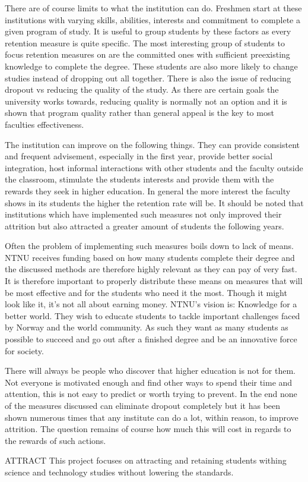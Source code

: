 \bigskip\noindent
There are of course limits to what the institution can do.
Freshmen start at these institutions with varying skills, abilities, interests and commitment to complete a given program of study.
It is useful to group students by these factors as every retention measure is quite specific.
The most interesting group of students to focus retention measures on are the committed ones with sufficient preexisting knowledge to complete the degree.
These students are also more likely to change studies instead of dropping out all together.
There is also the issue of reducing dropout vs reducing the quality of the study.
As there are certain goals the university works towards, reducing quality is normally not an option and it is shown that program quality rather than general appeal is the key to most faculties effectiveness.

\bigskip\noindent
The institution can improve on the following things.
They can provide consistent and frequent advisement, especially in the first year,
provide better social integration,
host informal interactions with other students and the faculty outside the classroom,
stimulate the students interests and provide them with the rewards they seek in higher education.
In general the more interest the faculty shows in its students the higher the retention rate will be.
It should be noted that institutions which have implemented such measures not only improved their attrition but also attracted a greater amount of students the following years.

\bigskip\noindent
Often the problem of implementing such measures boils down to lack of means.
NTNU receives funding based on how many students complete their degree and the discussed methods are therefore highly relevant as they can pay of very fast.
It is therefore important to properly distribute these means on measures that will be most effective and for the students who need it the most.
Though it might look like it, it's not all about earning money.
NTNU's vision is: Knowledge for a better world.
They wish to educate students to tackle important challenges faced by Norway and the world community.
As such they want as many students as possible to succeed and go out after a finished degree and be an innovative force for society. 

\bigskip\noindent
There will always be people who discover that higher education is not for them.
Not everyone is motivated enough and find other ways to spend their time and attention, this is not easy to predict or worth trying to prevent.
In the end none of the measures discussed can eliminate dropout completely but it has been shown numerous times that any institute can do a lot, within reason, to improve attrition. 
The question remains of course how much this will cost in regards to the rewards of such actions.

\bigskip\noindent
ATTRACT
This project focuses on attracting and retaining students withing science and technology studies without lowering the standards. 

